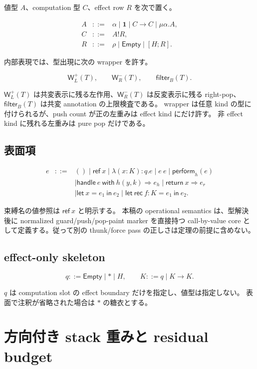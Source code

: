 \documentclass[uplatex,dvipdfmx,a4paper,10.5pt]{jsarticle}
\theoremstyle{jpplain}
\newcommand{\Empty}{\mathsf{Empty}}
\newcommand{\Unit}{\mathbf 1}
\newcommand{\Filter}[2]{\mathsf{filter}_{#1}(#2)}
\newcommand{\PWeight}[2]{\mathsf{W}^{+}_{#1}(#2)}
\newcommand{\NWeight}[2]{\mathsf{W}^{-}_{#1}(#2)}
\newcommand{\row}[2]{[#1;#2]}
\newcommand{\comp}{\mathbin{!}}
\newcommand{\kw}[1]{\mathsf{#1}}
\begin{document}
値型 $A$、computation 型 $C$、effect row $R$ を次で置く。

\[
\begin{array}{rcl}
A &::=& \alpha \mid \Unit \mid C\to C \mid \mu\alpha.A,\\
C &::=& A\comp R,\\
R &::=& \rho \mid \Empty \mid \row{H}{R}.
\end{array}
\]

内部表現では、型出現に次の wrapper を許す。

\[
  \PWeight{L}{T},\qquad
  \NWeight{R}{T},\qquad
  \Filter{B}{T}.
\]

$\PWeight{L}{T}$ は共変表示に残る左作用、$\NWeight{R}{T}$ は反変表示に残る right-pop、
$\Filter{B}{T}$ は共変 annotation の上限検査である。
wrapper は任意 kind の型に付けられるが、push count が正の左重みは effect kind にだけ許す。
非 effect kind に残れる左重みは pure pop だけである。

\subsection{表面項}

\[
\begin{array}{rcl}
e &::=& () \mid \kw{ref}\ x
 \mid \lambda(x:K):q.e
 \mid e\ e
 \mid \kw{perform}_{h}(e)\\
&& \mid \kw{handle}\ e\ \kw{with}\ h(y,k)\Rightarrow e_h
       \mid \kw{return}\ x\Rightarrow e_r\\
&& \mid \kw{let}\ x=e_1\ \kw{in}\ e_2
 \mid \kw{let\ rec}\ f:K=e_1\ \kw{in}\ e_2.
\end{array}
\]

束縛名の値参照は $\kw{ref}\ x$ と明示する。
本稿の operational semantics は、型解決後に normalized guard/push/pop-paint marker を直接持つ
call-by-value core として定義する。従って別の thunk/force pass の正しさは定理の前提に含めない。

\subsection{effect-only skeleton}

\[
  q ::= \Empty \mid \ast \mid H,
  \qquad
  K ::= q \mid K\to K.
\]

$q$ は computation slot の effect boundary だけを指定し、値型は指定しない。
表面で注釈が省略された場合は $\ast$ の糖衣とする。

\section{方向付き stack 重みと residual budget}
\end{document}
